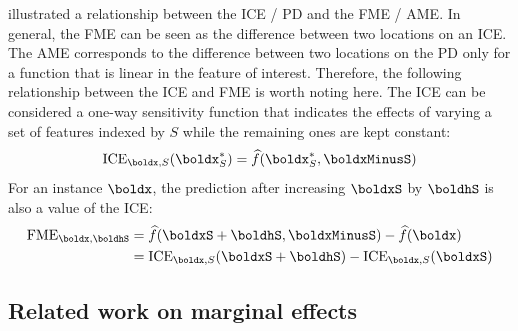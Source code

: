 \citet{scholbeck_fme} illustrated a relationship between the ICE / PD and the FME / AME. In general, the FME can be seen as the difference between two locations on an ICE. The AME corresponds to the difference between two locations on the PD only for a function that is linear in the feature of interest. Therefore, the following relationship between the ICE and FME is worth noting here. The ICE can be considered a one-way sensitivity function that indicates the effects of varying a set of features indexed by $S$ while the remaining ones are kept constant:
\begin{equation*}
     \text{ICE}_{\boldx, S}(\boldx^{\ast}_S) = \widehat{f}(\boldx^{\ast}_S, \boldxMinusS)
\end{equation*}
For an instance $\boldx$, the prediction after increasing $\boldxS$ by $\boldhS$ is also a value of the ICE:
\begin{align*}
     \text{FME}_{\boldx, \boldhS} &= \widehat{f}(\boldxS + \boldhS, \boldxMinusS) - \widehat{f}(\boldx) \\
     &= \text{ICE}_{\boldx, S}(\boldxS + \boldhS) - \text{ICE}_{\boldx, S}(\boldxS)
\end{align*}

\subsection{Related work on marginal effects}

